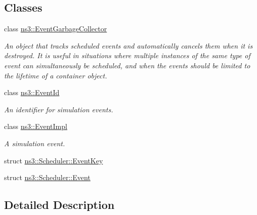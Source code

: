 \subsection*{Classes}
\begin{DoxyCompactItemize}
\item 
class \hyperlink{classns3_1_1EventGarbageCollector}{ns3\+::\+Event\+Garbage\+Collector}
\begin{DoxyCompactList}\small\item\em An object that tracks scheduled events and automatically cancels them when it is destroyed. It is useful in situations where multiple instances of the same type of event can simultaneously be scheduled, and when the events should be limited to the lifetime of a container object. \end{DoxyCompactList}\item 
class \hyperlink{classns3_1_1EventId}{ns3\+::\+Event\+Id}
\begin{DoxyCompactList}\small\item\em An identifier for simulation events. \end{DoxyCompactList}\item 
class \hyperlink{classns3_1_1EventImpl}{ns3\+::\+Event\+Impl}
\begin{DoxyCompactList}\small\item\em A simulation event. \end{DoxyCompactList}\item 
struct \hyperlink{structns3_1_1Scheduler_1_1EventKey}{ns3\+::\+Scheduler\+::\+Event\+Key}
\item 
struct \hyperlink{structns3_1_1Scheduler_1_1Event}{ns3\+::\+Scheduler\+::\+Event}
\end{DoxyCompactItemize}


\subsection{Detailed Description}
